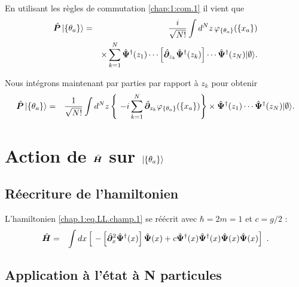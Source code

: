 En utilisant les règles de commutation \eqref{chap:1:com.1} il vient que 
\begin{eqnarray}
	\hat{\bm{P}}\ket{\{\theta_a\}} & = & \frac{i}{ \sqrt{N!}}  \int d^N z 	\, \varphi_{\{ \theta_a \}} ( \{x_a\}) \\ & & \times  \sum_{k = 1 }^N  \hat{\bm{\Psi}}^\dag(z_1) \cdots \left [\hat{\bm{\partial}}_{z_k} \hat{\bm{\Psi}}^\dag(z_k)\right ] \cdots \hat{\bm{\Psi}}^\dag(z_N) \vert \emptyset \rangle. 
\end{eqnarray}

Nous intégrons maintenant par parties par rapport à $z_k$ pour obtenir
\begin{eqnarray}
	\operator{P}\ket{\{\theta_a\}}& = & \frac{1}{ \sqrt{N!}}  \int d^N z 	 \left \{  -i \sum_{k = 1 }^N  \operator{\partial}_{z_k}\varphi_{\{ \theta_a \}} ( \{x_a\}) \right \}  \times \operator{\Psi}^\dag(z_1) \cdots \operator{\Psi}^\dag(z_N) \vert \emptyset \rangle. 
\end{eqnarray}



\section{Action de $\hat{\bm{H}}$ sur $\ket{\{\theta_a\}}$}

\subsection{Réecriture de l'hamiltonien}

L'hamiltonien \eqref{chap.1:eq.LL.champ.1} se réécrit avec $\hbar = 2 m =1$ et $c=g/2$ :
\begin{eqnarray}\label{annex.eq.H.1}
    \operator{H} & = & \int dx \left [ -\left [\operator{\partial}_x^2 \operator{\Psi}^\dag(x)\right ] \operator{\Psi}(x) + c \operator{\Psi}^\dag (x) \operator{\Psi}^\dag (x) \operator{\Psi} (x) \operator{\Psi} (x) \right ] \label{chap:1:hal.mod.2}.
\end{eqnarray}


\subsection{Application à l’état à N particules}

